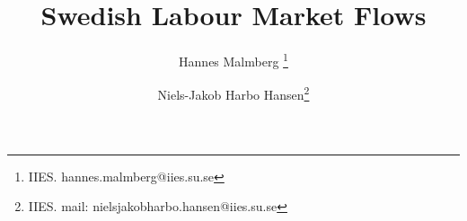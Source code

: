 \documentclass{article}[11pt]
\title{Swedish Labour Market Flows}
\author{
  Hannes Malmberg \footnote{IIES. hannes.malmberg@iies.su.se}\\
  \and
  Niels-Jakob Harbo Hansen\footnote{IIES. mail: nielsjakobharbo.hansen@iies.su.se}\\
}
\date{\parbox{\linewidth}{\centering%
  \today \endgraf\bigskip
  {\Large \textbf{Preliminary and incomplete - please do not cite}}\endgraf}}
\begin{document}
\maketitle 
%
\newpage

\newpage

\newpage

\newpage

\FloatBarrier
\newpage

\newpage


\end{document}
